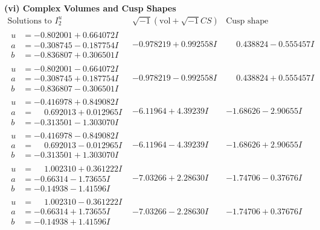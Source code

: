 \documentclass[1p]{elsarticle_modified}
\theoremstyle{definition}
\newcommand{\I}{\sqrt{-1}}
\begin{document}
\newpage\flushleft \textbf{(vi) Complex Volumes and Cusp Shapes}
$$\begin{array}{c|c|c}  
\text{Solutions to }I^u_{2}& \I (\text{vol} + \sqrt{-1}CS) & \text{Cusp shape}\\
 \hline 
\begin{aligned}
u &= -0.802001 + 0.664072 I \\
a &= -0.308745 - 0.187754 I \\
b &= -0.836807 + 0.306501 I\end{aligned}
 & -0.978219 + 0.992558 I & \phantom{-}0.438824 - 0.555457 I \\ \hline\begin{aligned}
u &= -0.802001 - 0.664072 I \\
a &= -0.308745 + 0.187754 I \\
b &= -0.836807 - 0.306501 I\end{aligned}
 & -0.978219 - 0.992558 I & \phantom{-}0.438824 + 0.555457 I \\ \hline\begin{aligned}
u &= -0.416978 + 0.849082 I \\
a &= \phantom{-}0.692013 + 0.012965 I \\
b &= -0.313501 - 1.303070 I\end{aligned}
 & -6.11964 + 4.39239 I & -1.68626 - 2.90655 I \\ \hline\begin{aligned}
u &= -0.416978 - 0.849082 I \\
a &= \phantom{-}0.692013 - 0.012965 I \\
b &= -0.313501 + 1.303070 I\end{aligned}
 & -6.11964 - 4.39239 I & -1.68626 + 2.90655 I \\ \hline\begin{aligned}
u &= \phantom{-}1.002310 + 0.361222 I \\
a &= -0.66314 - 1.73655 I \\
b &= -0.14938 - 1.41596 I\end{aligned}
 & -7.03266 + 2.28630 I & -1.74706 - 0.37676 I \\ \hline\begin{aligned}
u &= \phantom{-}1.002310 - 0.361222 I \\
a &= -0.66314 + 1.73655 I \\
b &= -0.14938 + 1.41596 I\end{aligned}
 & -7.03266 - 2.28630 I & -1.74706 + 0.37676 I \\ \hline\begin{aligned}

\end{aligned}
\end{array}$$
\end{document}
